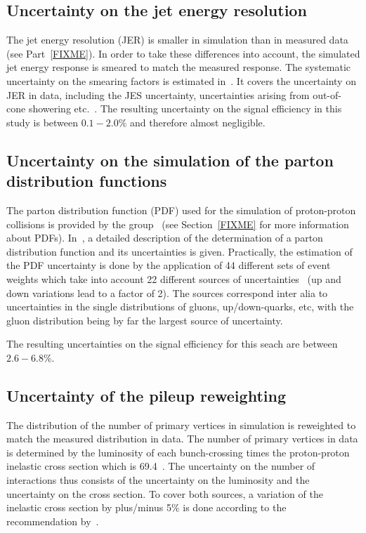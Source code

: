\subsection*{Uncertainty on the jet energy resolution}
The jet energy resolution (JER) is smaller in simulation than in measured data (see Part~\ref{FIXME}). 
In order to take these differences into account, the simulated jet energy response is smeared to match the measured response.
The systematic uncertainty on the smearing factors is estimated in~\cite{bib:CMS:JME_PAS,bib:Kristin_Thesis}.
It covers the uncertainty on JER in data, including the JES uncertainty, uncertainties arising from out-of-cone showering etc.~\cite{bib:CMS:JME_PAS,bib:Kristin_Thesis}.
The resulting uncertainty on the signal efficiency in this study is between $0.1-2.0\%$ and therefore almost negligible.

\subsection*{Uncertainty on the simulation of the parton distribution functions}
The parton distribution function (PDF) used for the simulation of proton-proton collisions is provided by the \cteq group~\cite{Pumplin:2002vw} (see Section~\ref{FIXME} for more information about PDFs).
In~\cite{Pumplin:2002vw}, a detailed description of the determination of a parton distribution function and its uncertainties is given.
Practically, the estimation of the PDF uncertainty is done by the application of 44 different sets of event weights which take into account 22 different sources of uncertainties~\cite{Botje:2011sn,bib:PDF_practical} 
(up and down variations lead to a factor of 2).
The sources correspond inter alia to uncertainties in the single distributions of gluons, up/down-quarks, etc, with the gluon distribution being by far the largest source of uncertainty.

The resulting uncertainties on the signal efficiency for this seach are between $2.6-6.8\%$.

\subsection*{Uncertainty of the pileup reweighting}
The distribution of the number of primary vertices in simulation is reweighted to match the measured distribution in data.
The number of primary vertices in data is determined by the luminosity of each bunch-crossing times the proton-proton inelastic cross section which is 69.4\mb~\cite{bib:CMS:PileupUtilities}.
The uncertainty on the number of interactions thus consists of the uncertainty on the luminosity and the uncertainty on the cross section.
To cover both sources, a variation of the inelastic cross section by plus/minus 5\% is done according to the recommendation by~\cite{bib:CMS:PileupSysUnc}.

